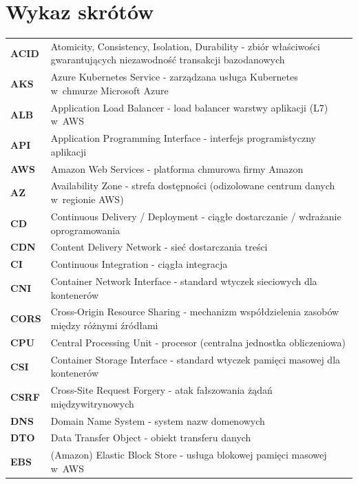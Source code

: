 \chapter*{Wykaz skrótów}
{}
\label{chap:wykaz-skrotow}

\begingroup
\setlength{\parskip}{0pt}
\renewcommand{\arraystretch}{1.3}

\begin{longtable}{@{}>{\bfseries}l@{\hspace{1.5em}}p{}@{}}
ACID    & Atomicity, Consistency, Isolation, Durability - zbiór właściwości gwarantujących niezawodność transakcji bazodanowych \\
AKS     & Azure Kubernetes Service - zarządzana usługa Kubernetes w~chmurze Microsoft Azure \\
ALB     & Application Load Balancer - load balancer warstwy aplikacji (L7) w~AWS \\
API     & Application Programming Interface - interfejs programistyczny aplikacji \\
AWS     & Amazon Web Services - platforma chmurowa firmy Amazon \\
AZ      & Availability Zone - strefa dostępności (odizolowane centrum danych w~regionie AWS) \\
CD      & Continuous Delivery / Deployment - ciągłe dostarczanie / wdrażanie oprogramowania \\
CDN     & Content Delivery Network - sieć dostarczania treści \\
CI      & Continuous Integration - ciągła integracja \\
CNI     & Container Network Interface - standard wtyczek sieciowych dla kontenerów \\
CORS    & Cross-Origin Resource Sharing - mechanizm współdzielenia zasobów między różnymi źródłami \\
CPU     & Central Processing Unit - procesor (centralna jednostka obliczeniowa) \\
CSI     & Container Storage Interface - standard wtyczek pamięci masowej dla kontenerów \\
CSRF    & Cross-Site Request Forgery - atak fałszowania żądań międzywitrynowych \\
DNS     & Domain Name System - system nazw domenowych \\
DTO     & Data Transfer Object - obiekt transferu danych \\
EBS     & (Amazon) Elastic Block Store - usługa blokowej pamięci masowej w~AWS \\

\end{longtable}
